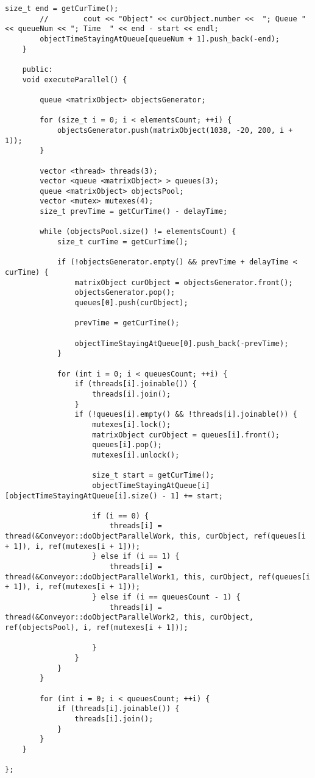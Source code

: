 \documentclass[12pt]{report}
\begin{document}
\begin{lstlisting}[label=some-code,caption=Код программы]
		size_t end = getCurTime();
		//        cout << "Object" << curObject.number <<  "; Queue " << queueNum << "; Time  " << end - start << endl;
		objectTimeStayingAtQueue[queueNum + 1].push_back(-end);
	}
	
	public:
	void executeParallel() {
		
		queue <matrixObject> objectsGenerator;
		
		for (size_t i = 0; i < elementsCount; ++i) {
			objectsGenerator.push(matrixObject(1038, -20, 200, i + 1));
		}
		
		vector <thread> threads(3);
		vector <queue <matrixObject> > queues(3);
		queue <matrixObject> objectsPool;
		vector <mutex> mutexes(4);
		size_t prevTime = getCurTime() - delayTime;
		
		while (objectsPool.size() != elementsCount) {
			size_t curTime = getCurTime();
			
			if (!objectsGenerator.empty() && prevTime + delayTime < curTime) {
				matrixObject curObject = objectsGenerator.front();
				objectsGenerator.pop();
				queues[0].push(curObject);
				
				prevTime = getCurTime();
				
				objectTimeStayingAtQueue[0].push_back(-prevTime);
			}
			
			for (int i = 0; i < queuesCount; ++i) {
				if (threads[i].joinable()) {
					threads[i].join();
				}
				if (!queues[i].empty() && !threads[i].joinable()) {
					mutexes[i].lock();
					matrixObject curObject = queues[i].front();
					queues[i].pop();
					mutexes[i].unlock();
					
					size_t start = getCurTime();
					objectTimeStayingAtQueue[i][objectTimeStayingAtQueue[i].size() - 1] += start;
					
					if (i == 0) {
						threads[i] = thread(&Conveyor::doObjectParallelWork, this, curObject, ref(queues[i + 1]), i, ref(mutexes[i + 1]));
					} else if (i == 1) {
						threads[i] = thread(&Conveyor::doObjectParallelWork1, this, curObject, ref(queues[i + 1]), i, ref(mutexes[i + 1]));
					} else if (i == queuesCount - 1) {
						threads[i] = thread(&Conveyor::doObjectParallelWork2, this, curObject, ref(objectsPool), i, ref(mutexes[i + 1]));
						
					}
				}
			}
		}
		
		for (int i = 0; i < queuesCount; ++i) {
			if (threads[i].joinable()) {
				threads[i].join();
			}
		}
	}
	
};
\end{lstlisting}
\end{document}
